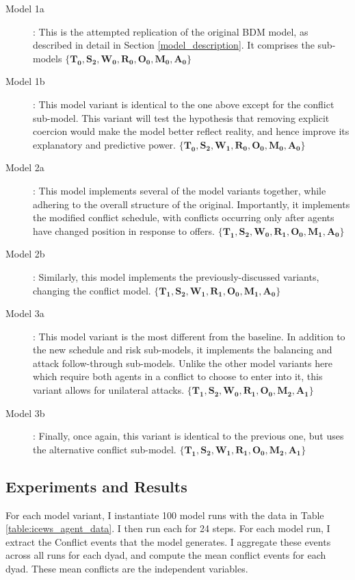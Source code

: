 \begin{description}
    \item[Model 1a]: This is the attempted replication of the original BDM model, as described in detail in Section \ref{model_description}. It comprises the sub-models  $\{\mathbf{T_0, S_2, W_0, R_0, O_0, M_0, A_0}\}$
    \item[Model 1b]: This model variant is identical to the one above except for the conflict sub-model. This variant will test the hypothesis that removing explicit coercion would make the model better reflect reality, and hence improve its explanatory and predictive power. $\{\mathbf{T_0, S_2, W_1, R_0, O_0, M_0, A_0}\}$
    \item[Model 2a]: This model implements several of the model variants together, while adhering to the overall structure of the original. Importantly, it implements the modified conflict schedule, with conflicts occurring only after agents have changed position in response to offers. $\{\mathbf{T_1, S_2, W_0, R_1, O_0, M_1, A_0}\}$
    \item[Model 2b]: Similarly, this model implements the previously-discussed variants, changing the conflict model. $\{\mathbf{T_1, S_2, W_1, R_1, O_0, M_1, A_0}\}$
    \item[Model 3a]: This model variant is the most different from the baseline. In addition to the new schedule and risk sub-models, it implements the balancing and attack follow-through sub-models. Unlike the other model variants here which require both agents in a conflict to choose to enter into it, this variant allows for unilateral attacks. $\{\mathbf{T_1, S_2, W_0, R_1, O_0, M_2, A_1}\}$
    \item[Model 3b]: Finally, once again, this variant is identical to the previous one, but uses the alternative conflict sub-model. $\{\mathbf{T_1, S_2, W_1, R_1, O_0, M_2, A_1}\}$
\end{description}

\subsection{Experiments and Results}

For each model variant, I instantiate 100 model runs with the data in Table \ref{table:icews_agent_data}. I then run each for 24 steps. For each model run, I extract the Conflict events that the model generates. I aggregate these events across all runs for each dyad, and compute the mean conflict events for each dyad. These mean conflicts are the independent variables. 

